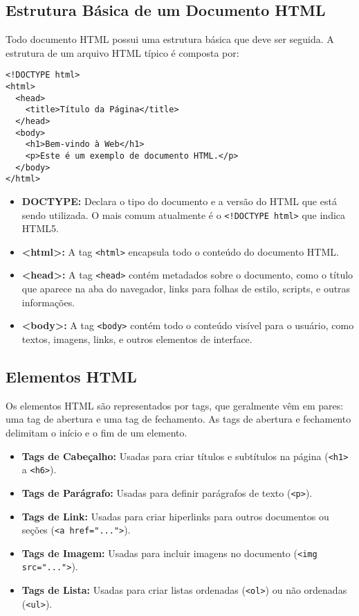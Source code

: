 \subsection{Estrutura Básica de um Documento HTML}

Todo documento HTML possui uma estrutura básica que deve ser seguida. A estrutura de um arquivo HTML típico é composta por:

\begin{verbatim}
<!DOCTYPE html>
<html>
  <head>
    <title>Título da Página</title>
  </head>
  <body>
    <h1>Bem-vindo à Web</h1>
    <p>Este é um exemplo de documento HTML.</p>
  </body>
</html>
\end{verbatim}

\begin{itemize}
    \item \textbf{DOCTYPE:} Declara o tipo do documento e a versão do HTML que está sendo utilizada. O mais comum atualmente é o \texttt{<!DOCTYPE html>} que indica HTML5.
    \item \textbf{<html>:} A tag \texttt{<html>} encapsula todo o conteúdo do documento HTML.
    \item \textbf{<head>:} A tag \texttt{<head>} contém metadados sobre o documento, como o título que aparece na aba do navegador, links para folhas de estilo, scripts, e outras informações.
    \item \textbf{<body>:} A tag \texttt{<body>} contém todo o conteúdo visível para o usuário, como textos, imagens, links, e outros elementos de interface.
\end{itemize}

\subsection{Elementos HTML}
Os elementos HTML são representados por tags, que geralmente vêm em pares: uma tag de abertura e uma tag de fechamento. As tags de abertura e fechamento delimitam o início e o fim de um elemento.

\begin{itemize}
    \item \textbf{Tags de Cabeçalho:} Usadas para criar títulos e subtítulos na página (\texttt{<h1>} a \texttt{<h6>}).
    \item \textbf{Tags de Parágrafo:} Usadas para definir parágrafos de texto (\texttt{<p>}).
    \item \textbf{Tags de Link:} Usadas para criar hiperlinks para outros documentos ou seções (\texttt{<a href="...">}).
    \item \textbf{Tags de Imagem:} Usadas para incluir imagens no documento (\texttt{<img src="...">}).
    \item \textbf{Tags de Lista:} Usadas para criar listas ordenadas (\texttt{<ol>}) ou não ordenadas (\texttt{<ul>}).
\end{itemize}


